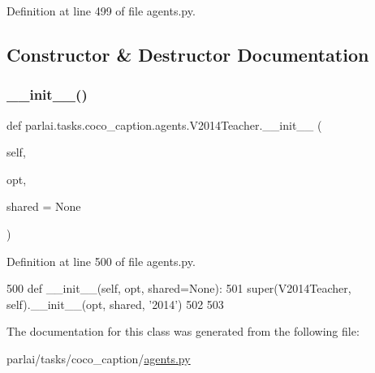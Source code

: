 Definition at line 499 of file agents.\+py.



\subsection{Constructor \& Destructor Documentation}
\mbox{\label{classparlai_1_1tasks_1_1coco__caption_1_1agents_1_1V2014Teacher_a270de04c549341bc63faf54b5f448108}} 
\subsubsection{\texorpdfstring{\+\_\+\+\_\+init\+\_\+\+\_\+()}{\_\_init\_\_()}}
{\footnotesize\ttfamily def parlai.\+tasks.\+coco\+\_\+caption.\+agents.\+V2014\+Teacher.\+\_\+\+\_\+init\+\_\+\+\_\+ (\begin{DoxyParamCaption}\item[{}]{self,  }\item[{}]{opt,  }\item[{}]{shared = {\ttfamily None} }\end{DoxyParamCaption})}



Definition at line 500 of file agents.\+py.


\begin{DoxyCode}
500     \textcolor{keyword}{def }\_\_init\_\_(self, opt, shared=None):
501         super(V2014Teacher, self).\_\_init\_\_(opt, shared, \textcolor{stringliteral}{'2014'})
502 
503 
\end{DoxyCode}


The documentation for this class was generated from the following file\+:\begin{DoxyCompactItemize}
\item 
parlai/tasks/coco\+\_\+caption/\hyperlink{parlai_2tasks_2coco__caption_2agents_8py}{agents.\+py}\end{DoxyCompactItemize}

